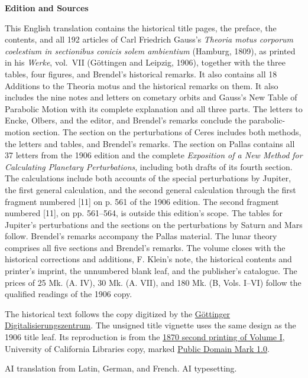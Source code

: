 \clearpage
\thispagestyle{empty}
\begin{center}\textbf{Edition and Sources}\end{center}
\noindent This English translation contains the historical title pages, the preface, the contents, and all 192 articles of Carl Friedrich Gauss’s \textit{Theoria motus corporum coelestium in sectionibus conicis solem ambientium} (Hamburg, 1809), as printed in his \textit{Werke}, vol.~VII (Göttingen and Leipzig, 1906), together with the three tables, four figures, and Brendel’s historical remarks. It also contains all 18 Additions to the Theoria motus and the historical remarks on them. It also includes the nine notes and letters on cometary orbits and Gauss’s New Table of Parabolic Motion with its complete explanation and all three parts. The letters to Encke, Olbers, and the editor, and Brendel’s remarks conclude the parabolic-motion section. The section on the perturbations of Ceres includes both methods, the letters and tables, and Brendel’s remarks. The section on Pallas contains all 37 letters from the 1906 edition and the complete \textit{Exposition of a New Method for Calculating Planetary Perturbations}, including both drafts of its fourth section. The calculations include both accounts of the special perturbations by Jupiter, the first general calculation, and the second general calculation through the first fragment numbered [11] on p. 561 of the 1906 edition. The second fragment numbered [11], on pp. 561–564, is outside this edition’s scope. The tables for Jupiter’s perturbations and the sections on the perturbations by Saturn and Mars follow. Brendel’s remarks accompany the Pallas material. The lunar theory comprises all five sections and Brendel’s remarks. The volume closes with the historical corrections and additions, F. Klein’s note, the historical contents and printer’s imprint, the unnumbered blank leaf, and the publisher’s catalogue. The prices of 25 Mk. (A. IV), 30 Mk. (A. VII), and 180 Mk. (B, Vols. I–VI) follow the qualified readings of the 1906 copy. 
\par\medskip\noindent The historical text follows the copy digitized by the \href{https://gdz.sub.uni-goettingen.de/id/PPN236008730}{Göttinger Digitalisierungszentrum}. The unsigned title vignette uses the same design as the 1906 title leaf. Its reproduction is from the \href{https://commons.wikimedia.org/w/index.php?oldid=1179960952}{1870 second printing of Volume I}, University of California Libraries copy, marked \href{https://creativecommons.org/publicdomain/mark/1.0/}{Public Domain Mark 1.0}.
\par\medskip\noindent AI translation from Latin, German, and French. AI typesetting.
